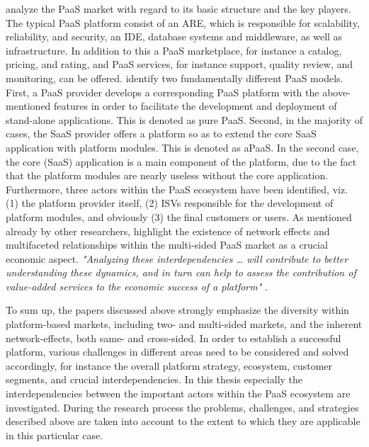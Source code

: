 \citet{Beimborn2011} analyze the \ac{PaaS} market with regard to its basic structure and the key players. The typical \ac{PaaS} platform consist of an \ac{ARE}, which is responsible for scalability, reliability, and security, an \ac{IDE}, database systems and middleware, as well as infrastructure. In addition to this a \ac{PaaS} marketplace, for instance a catalog, pricing, and rating, and \ac{PaaS} services, for instance support, quality review, and monitoring, can be offered. \citet{Beimborn2011} identify two fundamentally different \ac{PaaS} models. First, a \ac{PaaS} provider develops a corresponding \ac{PaaS} platform with the above-mentioned features in order to facilitate the development and deployment of stand-alone applications. This is denoted as pure \ac{PaaS}. Second, in the majority of cases, the \ac{SaaS} provider offers a platform so as to extend the core \ac{SaaS} application with platform modules. This is denoted as \ac{aPaaS}. In the second case, the core (\ac{SaaS}) application is a main component of the platform, due to the fact that the platform modules are nearly useless without the core application. Furthermore, three actors within the \ac{PaaS} ecosystem have been identified, viz. (1) the platform provider itself, (2) \acp{ISV} responsible for the development of platform modules, and obviously (3) the final customers or users. As mentioned already by other researchers, \citet{Beimborn2011} highlight the existence of network effects and multifaceted relationships within the multi-sided \ac{PaaS} market as a crucial economic aspect. \textit{"Analyzing these interdependencies \ldots\xspace will contribute to better understanding these dynamics, and in turn can help to assess the contribution of value-added services to the economic success of a platform"} \citep[p. 84]{Beimborn2011}.

To sum up, the papers discussed above strongly emphasize the diversity within platform-based markets, including two- and multi-sided markets, and the inherent network-effects, both same- and cross-sided. In order to establish a successful platform, various challenges in different areas need to be considered and solved accordingly, for instance the overall platform strategy, ecosystem, customer segments, and crucial interdependencies. In this thesis especially the interdependencies between the important actors within the \ac{PaaS} ecosystem are investigated. During the research process the problems, challenges, and strategies described above are taken into account to the extent to which they are applicable in this particular case.

